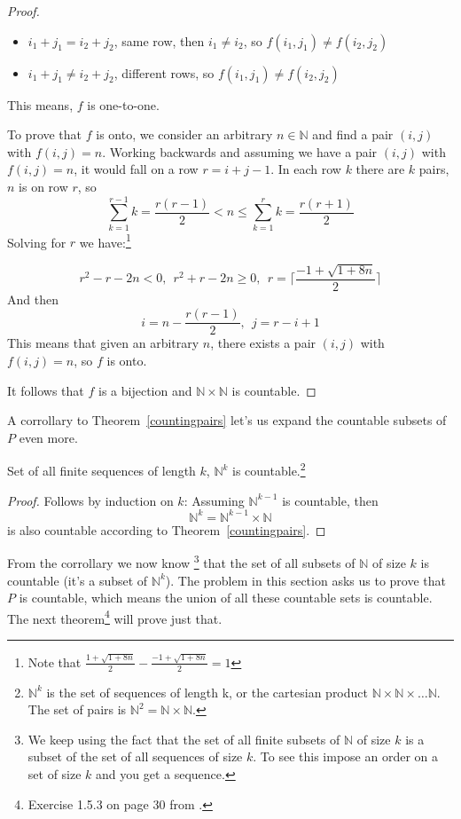 \begin{proof}
\begin{itemize}
\item $i_1+j_1=i_2+j_2$, same row, then $i_1 \ne i_2$, so $f(i_1, j_1) \ne f(i_2, j_2)$
\item $i_1+j_1 \ne i_2+j_2$, different rows, so $f(i_1, j_1) \ne f(i_2, j_2)$
\end{itemize}

This means, $f$ is one-to-one.

To prove that $f$ is onto, we consider an arbitrary $n \in \mathbb{N}$ and find a pair $(i, j)$ with $f(i, j)=n$. Working backwards and assuming we have a pair $(i, j)$ with $f(i, j)=n$, it would fall on a row $r = i + j - 1$. In each row $k$ there are $k$ pairs, $n$ is on row $r$, so
$$
\sum_{k=1}^{r-1} k = \frac{r(r-1)}{2} < n \leq \sum_{k=1}^{r} k = \frac{r(r+1)}{2}
$$
Solving for $r$ we have:\footnote{Note that $\frac{1 + \sqrt{1 + 8 n}}{2} - \frac{-1 + \sqrt{1 + 8 n}}{2} = 1$}

$$
r^2 - r - 2n < 0, ~~r^2 + r - 2n \geq 0, ~~r = \bigg\lceil \frac{-1 + \sqrt{1 + 8 n}}{2} \bigg\rceil
$$
And then
$$
i = n - \frac{r(r - 1)}{2}, ~~j = r - i + 1
$$
This means that given an arbitrary $n$, there exists a pair $(i, j)$ with $f(i, j)=n$, so $f$ is onto.

It follows that $f$ is a bijection and $\mathbb{N} \times \mathbb{N}$ is countable.
\end{proof}

A corrollary to Theorem~\ref{countingpairs} let's us expand the countable subsets of $P$ even more.

\begin{cor}
Set of all finite sequences of length $k$, $\mathbb{N}^k$ is countable.\footnote{$\mathbb{N}^k$ is the set of sequences of length k, or the cartesian product 
$\mathbb{N} \times \mathbb{N} \times \dots \mathbb{N}$. The set of pairs is $\mathbb{N}^2=\mathbb{N} \times \mathbb{N}$.}
\end{cor}

\begin{proof}
Follows by induction on $k$: Assuming $\mathbb{N}^{k - 1}$ is countable, then
$$
\mathbb{N}^k = \mathbb{N}^{k - 1} \times \mathbb{N}
$$
is also countable according to Theorem~\ref{countingpairs}.
\end{proof}

From the corrollary we now know \footnote{We keep using the fact that the set of all finite subsets of $\mathbb{N}$ of size $k$ is a subset of the set of all sequences of size $k$. To see this impose an order on a set of size $k$ and you get a sequence.} that the set of all subsets of $\mathbb{N}$ of size $k$ is countable (it's a subset of $\mathbb{N}^k$). The problem in this section asks us to prove that $P$ is countable, which means the union of all these countable sets is countable. The next theorem\footnote{Exercise 1.5.3 on page 30 from .} will prove just that.


